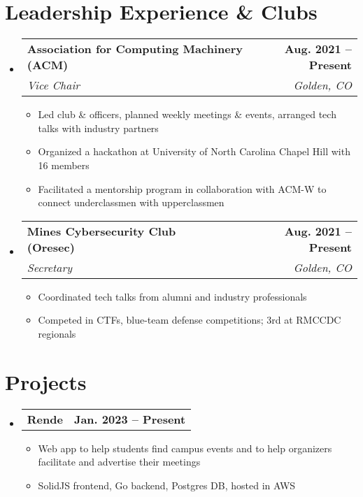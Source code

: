 \documentclass[11pt, letterpaper]{article}
\makeatletter
\newcommand{\resumeItem}[1]{
  \item\small{
    {#1 \vspace{-2pt}}
  }
}
\newcommand{\resumeSubheading}[4]{
  \vspace{-2pt}\item
    \begin{tabular*}{1.0\textwidth}[t]{l@{\extracolsep{\fill}}r}
      \textbf{#1} & \textbf{\small #2} \\
      \textit{\small#3} & \textit{\small #4} \\
    \end{tabular*}\vspace{-7pt}
}
\newcommand{\resumeProjectHeading}[2]{
  \vspace{-2pt}\item
  \begin{tabular*}{1.0\textwidth}[t]{l@{\extracolsep{\fill}}r}
    \textbf{#1} & \textbf{\small #2} \\
  \end{tabular*}\vspace{-7pt}
}
\newcommand{\resumeSubHeadingListStart}{\begin{itemize}[leftmargin=0.0in, label={}]}
\newcommand{\resumeSubHeadingListEnd}{\end{itemize}}
\newcommand{\resumeItemListStart}{\begin{itemize}}
\newcommand{\resumeItemListEnd}{\end{itemize}\vspace{-5pt}}
\makeatother
\begin{document}
\section{Leadership Experience \& Clubs}  %
  \resumeSubHeadingListStart
    \resumeSubheading
      {Association for Computing Machinery (ACM)}{Aug. 2021 -- Present}
      {Vice Chair}{Golden, CO}
      \resumeItemListStart
        \resumeItem{Led club \& officers, planned weekly meetings \& events, arranged tech talks with industry partners}
        \resumeItem{Organized a hackathon at University of North Carolina Chapel Hill with 16 members}
        \resumeItem{Facilitated a mentorship program in collaboration with ACM-W to connect underclassmen with upperclassmen}
      \resumeItemListEnd

    \resumeSubheading
      {Mines Cybersecurity Club (Oresec) }{Aug. 2021 -- Present}
      {Secretary}{Golden, CO}
      \resumeItemListStart
        \resumeItem{Coordinated tech talks from alumni and industry professionals}
        \resumeItem{Competed in CTFs, blue-team defense competitions; 3rd at RMCCDC regionals}
      \resumeItemListEnd


  \resumeSubHeadingListEnd

\section{Projects}    %
    \resumeSubHeadingListStart
      \resumeProjectHeading
      {Rende}{Jan. 2023 -- Present}
        \resumeItemListStart
          \resumeItem{Web app to help students find campus events and to help organizers facilitate and advertise their meetings}
          \resumeItem{SolidJS frontend, Go backend, Postgres DB, hosted in AWS}
        \resumeItemListEnd
    \resumeSubHeadingListEnd
\end{document}
